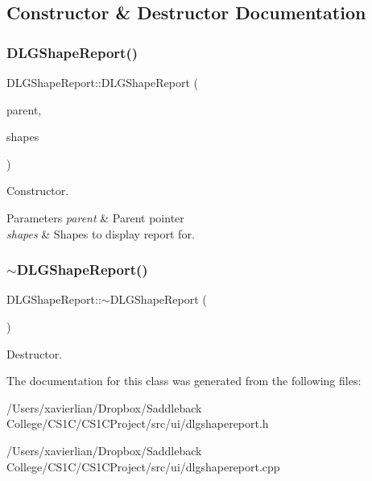 \subsection{Constructor \& Destructor Documentation}
\mbox{\label{class_d_l_g_shape_report_a9c117a45f345cf9a2c35dd3d73ac3c74}} 
\subsubsection{\texorpdfstring{DLGShapeReport()}{DLGShapeReport()}}
{\footnotesize\ttfamily D\+L\+G\+Shape\+Report\+::\+D\+L\+G\+Shape\+Report (\begin{DoxyParamCaption}\item[{Q\+Widget $\ast$}]{parent,  }\item[{Q\+Vector$<$ \mbox{\hyperlink{class_i_shape}{I\+Shape}} $\ast$ $>$}]{shapes }\end{DoxyParamCaption})\hspace{0.3cm}{\ttfamily [explicit]}}



Constructor. 


\begin{DoxyParams}{Parameters}
{\em parent} & Parent pointer \\
\hline
{\em shapes} & Shapes to display report for. \\
\hline
\end{DoxyParams}
\mbox{\label{class_d_l_g_shape_report_ab32053bd02b4591171a8332f47020b31}} 
\subsubsection{\texorpdfstring{$\sim$DLGShapeReport()}{~DLGShapeReport()}}
{\footnotesize\ttfamily D\+L\+G\+Shape\+Report\+::$\sim$\+D\+L\+G\+Shape\+Report (\begin{DoxyParamCaption}{ }\end{DoxyParamCaption})}



Destructor. 



The documentation for this class was generated from the following files\+:\begin{DoxyCompactItemize}
\item 
/\+Users/xavierlian/\+Dropbox/\+Saddleback College/\+C\+S1\+C/\+C\+S1\+C\+Project/src/ui/dlgshapereport.\+h\item 
/\+Users/xavierlian/\+Dropbox/\+Saddleback College/\+C\+S1\+C/\+C\+S1\+C\+Project/src/ui/dlgshapereport.\+cpp\end{DoxyCompactItemize}
